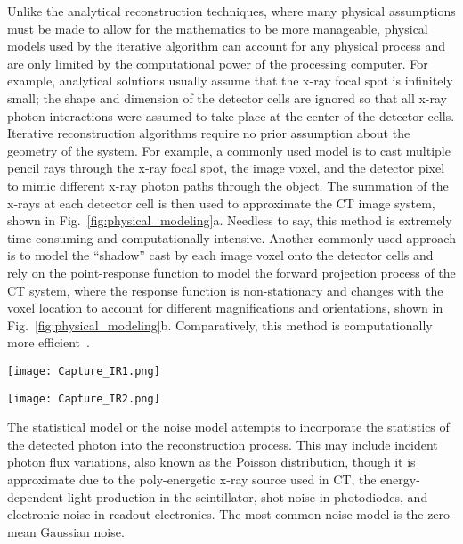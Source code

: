 Unlike the analytical reconstruction techniques, where many physical assumptions must be made to allow for the mathematics to be more manageable, physical models used by the iterative algorithm can account for any physical process and are only limited by the computational power of the processing computer.  For example, analytical solutions usually assume that the x-ray focal spot is infinitely small; the shape and dimension of the detector cells are ignored so that all x-ray photon interactions were assumed to take place at the center of the detector cells.  Iterative reconstruction algorithms require no prior assumption about the geometry of the system.  For example, a commonly used model is to cast multiple pencil rays through the x-ray focal spot, the image voxel, and the detector pixel to mimic different x-ray photon paths through the object.  The summation of the x-rays at each detector cell is then used to approximate the CT image system, shown in Fig.~\ref{fig:physical_modeling}a. Needless to say, this method is extremely time-consuming and computationally intensive.  Another commonly used approach is to model the ``shadow'' cast by each image voxel onto the detector cells and rely on the point-response function to model the forward projection process of the CT system, where the response function is non-stationary and changes with the voxel location to account for different magnifications and orientations, shown in Fig.~\ref{fig:physical_modeling}b.  Comparatively, this method is computationally more efficient~\citep{Hsieh2013}.
%
\begin{figure*}
	\begin{minipage}{0.4\linewidth}
	\texttt{[image: Capture\_IR1.png]}
	\subcaption{}
	\end{minipage}
	\begin{minipage}{0.4\linewidth}
	\texttt{[image: Capture\_IR2.png]}
	\subcaption{}
	\end{minipage}
\caption[]{Common physical models used for the iterative reconstruction algorithm\footnotemark. (a) The pencil beam model; and (b) the point-response model.}
\label{fig:physical_modeling}
\end{figure*}



The statistical model or the noise model attempts to incorporate the statistics of the detected photon into the reconstruction process.  This may include incident photon flux variations, also known as the Poisson distribution, though it is approximate due to the poly-energetic x-ray source used in CT, the energy-dependent light production in the scintillator, shot noise in photodiodes, and electronic noise in readout electronics. The most common noise model is the zero-mean Gaussian noise.

